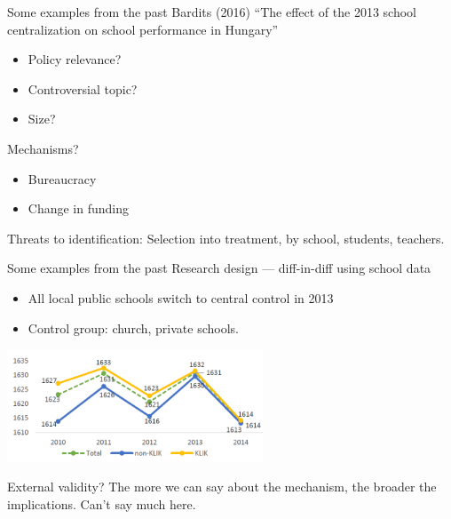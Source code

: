 \documentclass[notes=show,beamer,compress]{beamer}
\begin{document}
\begin{frame}{Some examples from the past}
	Bardits (2016) ``The effect of the 2013 school centralization on school performance in Hungary''
	
	\begin{itemize}
		\item Policy relevance?
		\item Controversial topic?
		\item Size?
	\end{itemize}
	Mechanisms?
	\begin{itemize}
		\item Bureaucracy
		\item Change in funding
	\end{itemize}

	Threats to identification: Selection into treatment, by school, students, teachers.
\end{frame}

\begin{frame}{Some examples from the past}
	Research design --- diff-in-diff using school data
	\begin{itemize}
		\item All local public schools switch to central control in 2013
		\item Control group: church, private schools.
	\end{itemize}
	\begin{center}
	\includegraphics[width=3in]{graphs/bardits.png}
	\end{center}
	External validity? The more we can say about the mechanism, the broader the implications. Can't say much here.
\end{frame}
\end{document}
